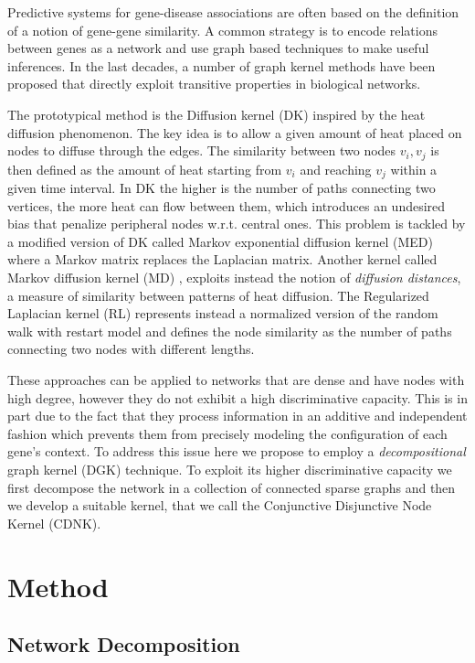 \documentclass{esannV2}
\begin{document}
Predictive systems for gene-disease associations are often based on the
definition of a notion of gene-gene similarity. A common strategy is to encode
relations between genes as a network and use graph based techniques to make
useful inferences. In the last decades, a number of graph kernel methods have
been proposed that directly exploit transitive properties in biological
networks.

The prototypical method is the Diffusion kernel (DK) \cite{ledk} inspired by
the heat diffusion phenomenon. The key idea is to allow a given amount of heat
placed on nodes to diffuse through the edges. The similarity between two nodes
$v_{i}, v_{j}$ is then defined as the amount of heat starting from $v_{i}$ and
reaching $v_{j}$ within a given time interval. In DK the higher is the number
of paths connecting two vertices, the more heat can flow between them, which
introduces an undesired bias that penalize peripheral nodes w.r.t. central
ones. This problem is tackled by a modified version of DK  called Markov
exponential diffusion kernel (MED) \cite{medk} where a Markov matrix replaces
the Laplacian matrix.  Another kernel called Markov diffusion kernel (MD)
\cite{mdk}, exploits instead the notion of {\em diffusion distances}, a
measure of similarity between patterns of heat diffusion. The Regularized
Laplacian kernel (RL) \cite{rlk} represents instead a normalized version of
the random walk with restart model and defines the node similarity as the
number of paths connecting two nodes with different lengths.

These approaches can be applied to networks that are dense and have nodes with
high degree, however they do not exhibit a high discriminative capacity.
This is in part due to the fact that they process information in an additive
and independent fashion which prevents them from precisely modeling the
configuration of each gene's context. To address this issue here we propose to
employ a {\em decompositional} graph kernel (DGK) \cite{covolution_kernel}
technique. To exploit its higher discriminative capacity we first decompose
the network in a collection of connected sparse graphs and then we develop a
suitable kernel, that we call the Conjunctive Disjunctive Node Kernel (CDNK).


\section{Method}\label{method}

\subsection{Network Decomposition}
\end{document}
